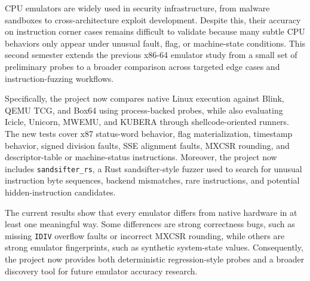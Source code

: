 CPU emulators are widely used in security infrastructure, from malware sandboxes to cross-architecture exploit development. Despite this, their accuracy on instruction corner cases remains difficult to validate because many subtle CPU behaviors only appear under unusual fault, flag, or machine-state conditions. This second semester extends the previous x86-64 emulator study from a small set of preliminary probes to a broader comparison across targeted edge cases and instruction-fuzzing workflows.

Specifically, the project now compares native Linux execution against Blink, QEMU TCG, and Box64 using process-backed probes, while also evaluating Icicle, Unicorn, MWEMU, and KUBERA through shellcode-oriented runners. The new tests cover x87 status-word behavior, flag materialization, timestamp behavior, signed division faults, SSE alignment faults, MXCSR rounding, and descriptor-table or machine-status instructions. Moreover, the project now includes \texttt{sandsifter\_rs}, a Rust sandsifter-style fuzzer used to search for unusual instruction byte sequences, backend mismatches, rare instructions, and potential hidden-instruction candidates.

The current results show that every emulator differs from native hardware in at least one meaningful way. Some differences are strong correctness bugs, such as missing \texttt{IDIV} overflow faults or incorrect MXCSR rounding, while others are strong emulator fingerprints, such as synthetic system-state values. Consequently, the project now provides both deterministic regression-style probes and a broader discovery tool for future emulator accuracy research.
